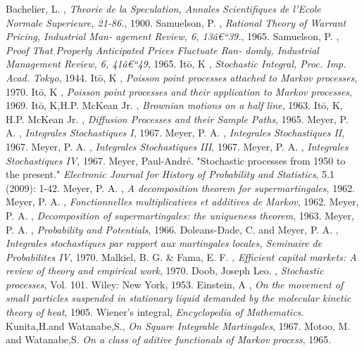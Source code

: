 \documentclass{article}
\begin{document}
\begin{thebibliography}{MMMMM} 
 Bachelier, L. , \textit{Theorie de la Speculation, Annales Scientifiques de l'Ecole Normale Superieure, 21-86.}, 1900.
 Samuelson, P. , \textit{Rational Theory of Warrant Pricing, Industrial Man- agement Review, 6, 13â€“39.}, 1965.
 Samuelson, P. , \textit{Proof That Properly Anticipated Prices Fluctuate Ran- domly, Industrial Management Review, 6, 41â€“49}, 1965.
 It\={o}, K  , \textit{Stochastic Integral, Proc. Imp. Acad. Tokyo}, 1944.
 It\={o}, K  , \textit{Poisson point processes attached to Markov processes}, 1970.
 It\={o}, K  , \textit{Poisson point processes and their application to Markov processes}, 1969.
 It\={o}, K,H.P. McKean Jr.  , \textit{Brownian motions on a half line}, 1963.
 It\={o}, K, H.P. McKean Jr. , \textit{Diffusion Processes and their Sample Paths}, 1965.
 Meyer, P. A.  , \textit{Integrales Stochastiques I}, 1967.
 Meyer, P. A.  , \textit{Integrales Stochastiques II}, 1967.
 Meyer, P. A.  , \textit{Integrales Stochastiques III}, 1967.
 Meyer, P. A.  , \textit{Integrales Stochastiques IV}, 1967.
 Meyer, Paul-Andr\'{e}. "Stochastic processes from 1950 to the present." \textit{Electronic Journal for History of Probability and Statistics}, 5.1 (2009): 1-42.
 Meyer, P. A.  , \textit{A decomposition theorem for supermartingales}, 1962.
 Meyer, P. A.  , \textit{Fonctionnelles multiplicatives et additives de Markov}, 1962.
 Meyer, P. A.  , \textit{Decomposition of supermartingales: the uniqueness theorem}, 1963.
 Meyer, P. A.  , \textit{Probability and Potentials}, 1966.
 Doleans-Dade, C. and Meyer, P. A.  , \textit{Integrales stochastiques par rapport aux martingales locales, Seminaire de Probabilites IV}, 1970.
 Malkiel, B. G. \& Fama, E. F.  , \textit{Efficient capital markets: A review of theory and empirical work}, 1970.
 Doob, Joseph Leo.  , \textit{Stochastic processes}, Vol. 101. Wiley: New York, 1953.
 Einstein, A  , \textit{On the movement of small particles suspended in stationary liquid demanded by the molecular kinetic theory of heat}, 1905.
 Wiener’s integral,  \textit{Encyclopedia of Mathematics}.
 Kunita,H.and Watanabe,S.,  \textit{On Square Integrable Martingales}, 1967.
 Motoo, M. and Watanabe,S.  \textit{On a class of aditive functionals of Markov process}, 1965.


\end{thebibliography}


\end{document}
